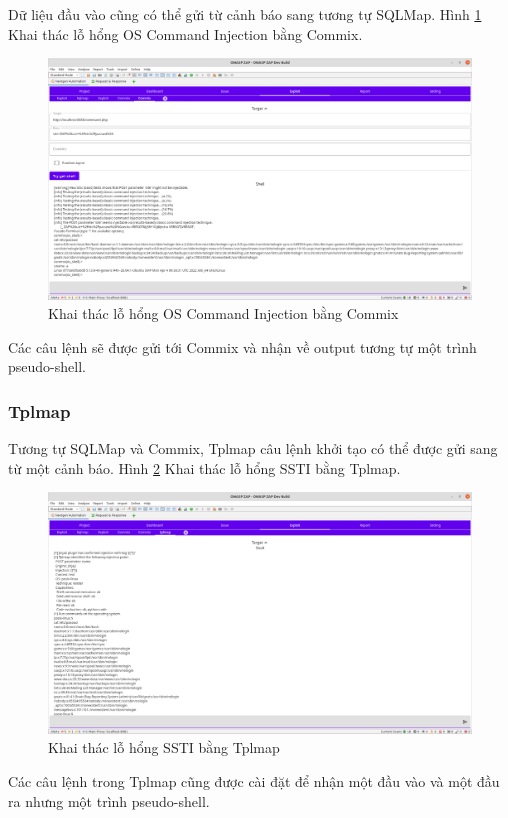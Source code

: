 \documentclass[./../main.tex]{subfiles}
\begin{document}
Dữ liệu đầu vào cũng có thể gửi từ cảnh báo sang tương tự SQLMap.
Hình \ref{fig:commix_exploit} Khai thác lỗ hổng OS Command Injection bằng Commix.

\begin{figure}[h!]
	\includegraphics[width=\linewidth]{./images/commix_exploit.png}
	\caption{Khai thác lỗ hổng OS Command Injection bằng Commix	}
	\label{fig:commix_exploit}
\end{figure}
Các câu lệnh sẽ được gửi tới Commix và nhận về output tương tự một trình pseudo-shell.
\subsubsection{Tplmap}
Tương tự SQLMap và Commix, Tplmap  câu lệnh khởi tạo có thể được gửi sang từ một cảnh báo.
Hình \ref{fig:tplmap_exploit} Khai thác lỗ hổng SSTI bằng Tplmap.

\begin{figure}[h!]
	\includegraphics[width=\linewidth]{./images/tplmap_exploit.png}
	\caption{Khai thác lỗ hổng SSTI bằng Tplmap}
	\label{fig:tplmap_exploit}
\end{figure}
Các câu lệnh trong Tplmap cũng được cài đặt để nhận một đầu vào và một đầu ra nhưng một trình pseudo-shell.
\end{document}
